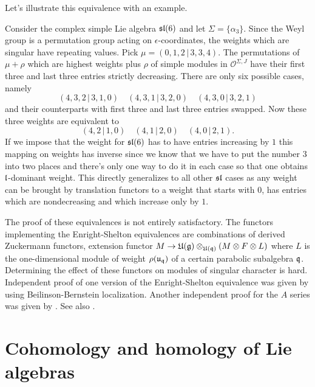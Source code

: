 Let's illustrate this equivalence with an example. 
\begin{example}
Consider the complex simple Lie algebra $\mathfrak{sl}(6)$ and let $\Sigma = \{\alpha_3\}$. Since the Weyl group is a permutation group acting on $\epsilon$-coordinates, the weights which are singular have repeating values. Pick $\mu = (0,1,2\, |\, 3,3,4)$. The permutations of $\mu + \rho$ which are highest weights plus $\rho$ of simple modules in $\mathcal{O}^{\Sigma, J}$ have their first three and last three entries strictly decreasing.  There are only six possible cases, namely
\[
(4, 3, 2\, |\, 3, 1, 0) \quad (4, 3, 1\, |\,3, 2, 0) \quad (4, 3, 0\, |\,3, 2, 1)
\]
and their counterparts with first three and last three entries swapped. Now these three weights are equivalent to 
\[
(4,  2\, |\,  1, 0) \quad (4,  1\, |\, 2, 0) \quad (4,  0\, |\, 2, 1).
\]
If we impose that the weight for $\mathfrak{sl}(6)$ has to have entries increasing by $1$ this mapping on weights has inverse since we know that we have to put the number $3$ into two places and there's only one way to do it in each case so that one obtains $\mathfrak{l}$-dominant weight. This directly generalizes to all other $\mathfrak{sl}$ cases as any weight can be brought by translation functors to a weight that starts with $0$, has entries which are nondecreasing and which increase only by $1$.
\end{example}

\begin{remark}
The proof of these equivalences is not entirely satisfactory. The functors implementing the Enright-Shelton equivalences are combinations of derived Zuckermann functors, extension functor $M \to \mathfrak{U(g)} \otimes_{\mathfrak{U(q)}} (M \otimes F \otimes L)$ where $L$ is the one-dimensional module of weight $\rho(\mathfrak{u_q})$ of a certain parabolic subalgebra $\mathfrak{q}$. Determining the effect of these functors on modules of singular character is hard. Independent proof of one version of the Enright-Shelton equivalence was given by \cite{soergel_mathscr_1988} using Beilinson-Bernstein localization. Another independent proof for the $A$ series was given by \cite{bernstein_categorification_1999}. See also \cite{pandzic_bgg_2016}.
\end{remark}

\section{Cohomology and homology of Lie algebras}

